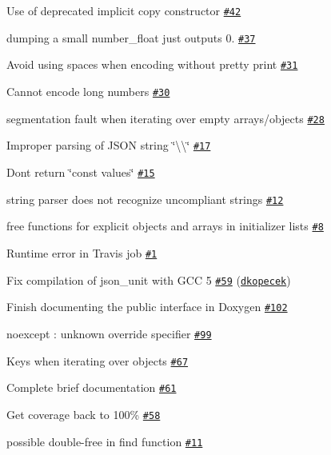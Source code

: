 \begin{DoxyItemize}
\item Use of deprecated implicit copy constructor \href{https://github.com/nlohmann/json/issues/42}{\tt \#42}
\item dumping a small number\+\_\+float just outputs 0. \href{https://github.com/nlohmann/json/issues/37}{\tt \#37}
\item Avoid using spaces when encoding without pretty print \href{https://github.com/nlohmann/json/issues/31}{\tt \#31}
\item Cannot encode long numbers \href{https://github.com/nlohmann/json/issues/30}{\tt \#30}
\item segmentation fault when iterating over empty arrays/objects \href{https://github.com/nlohmann/json/issues/28}{\tt \#28}
\item Improper parsing of J\+S\+ON string \char`\"{}\textbackslash{}\textbackslash{}\char`\"{} \href{https://github.com/nlohmann/json/issues/17}{\tt \#17}
\item Don\textquotesingle{}t return \char`\"{}const values\char`\"{} \href{https://github.com/nlohmann/json/issues/15}{\tt \#15}
\item string parser does not recognize uncompliant strings \href{https://github.com/nlohmann/json/issues/12}{\tt \#12}
\item free functions for explicit objects and arrays in initializer lists \href{https://github.com/nlohmann/json/issues/8}{\tt \#8}
\item Runtime error in Travis job \href{https://github.com/nlohmann/json/issues/1}{\tt \#1}
\item Fix compilation of json\+\_\+unit with G\+CC 5 \href{https://github.com/nlohmann/json/pull/59}{\tt \#59} (\href{https://github.com/dkopecek}{\tt dkopecek})
\item Finish documenting the public interface in Doxygen \href{https://github.com/nlohmann/json/issues/102}{\tt \#102}
\item \textquotesingle{}noexcept\textquotesingle{} \+: unknown override specifier \href{https://github.com/nlohmann/json/issues/99}{\tt \#99}
\item Keys when iterating over objects \href{https://github.com/nlohmann/json/issues/67}{\tt \#67}
\item Complete brief documentation \href{https://github.com/nlohmann/json/issues/61}{\tt \#61}
\item Get coverage back to 100\% \href{https://github.com/nlohmann/json/issues/58}{\tt \#58}
\item possible double-\/free in find function \href{https://github.com/nlohmann/json/issues/11}{\tt \#11}

\end{DoxyItemize}
